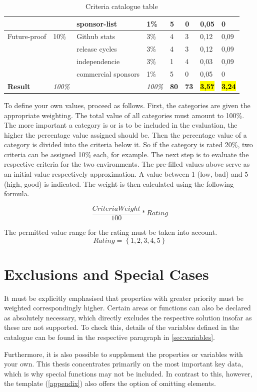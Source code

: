 \documentclass[MSC,Master,english]{twbook}%
\begin{document}
\begin{table}[ht]
\begin{center}
{\begin{tabular}{|l|l|l|l|l|l|l|l|}
            & & sponsor-list & 1\% & 5 & 0 & 0,05 & 0 \\
            \hline
            Future-proof & 10\% & Github stats & 3\% & 4 & 3 & 0,12 & 0,09 \\
            & & release cycles & 3\% & 4 & 3 & 0,12 & 0,09 \\
            & & independencie & 3\% & 1 & 4 & 0,03 & 0,09 \\
            & & commercial sponsors & 1\% & 5 & 0 & 0,05 & 0 \\
            \hline \hline
            \textbf{Result} & \textit{100\%} & & \textit{100\%} & \textbf{80} & \textbf{73} & \hl{\textbf{3,57}} & \hl{\textbf{3,24}} \\
            \hline
        \end{tabular}}
        \caption{Criteria catalogue table}
        \label{tab:cct}
    \end{center}
\end{table}
To define your own values, proceed as follows. First, the categories are given the appropriate weighting. The total value of all categories must amount to 100\%. The more important a category is or is to be included in the evaluation, the higher the percentage value assigned should be. Then the percentage value of a category is divided into the criteria below it. So if the category is rated 20\%, two criteria can be assigned 10\% each, for example. The next step is to evaluate the respective criteria for the two environments. The pre-filled values above serve as an initial value respectively approximation. A value between 1 (low, bad) and 5 (high, good) is indicated. The weight is then calculated using the following formula.

\begin{equation*}
    \frac{CriteriaWeight}{100}*Rating
\end{equation*}

The permitted value range for the rating must be taken into account.
\begin{equation*}
    Rating = \left\{1,2,3,4,5 \right\}
\end{equation*}

\section{Exclusions and Special Cases}
\label{sec:exclusions}
It must be explicitly emphasised that properties with greater priority must be weighted correspondingly higher. Certain areas or functions can also be declared as absolutely necessary, which directly excludes the respective solution insofar as these are not supported. To check this, details of the variables defined in the catalogue can be found in the respective paragraph in \autoref{sec:variables}. \par
Furthermore, it is also possible to supplement the properties or variables with your own. This thesis concentrates primarily on the most important key data, which is why special functions may not be included. In contrast to this, however, the template (\autoref{appendix}) also offers the option of omitting elements.
\end{document}
